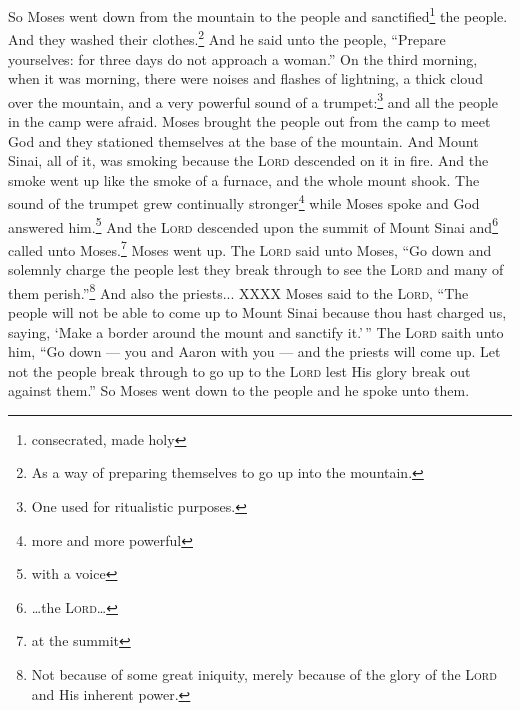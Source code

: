 \begin{enumerate}[align=center]
     So Moses went down from the mountain to the people and sanctified\footnote{consecrated, made holy} the people. And they washed their clothes.\footnote{As a way of preparing themselves to go up into the mountain.}%
     And he said unto the people, ``Prepare yourselves: for three days do not approach a woman.''%
     On the third morning, when it was morning, there were noises and flashes of lightning, a thick cloud over the mountain, and a very powerful sound of a trumpet:\footnote{One used for ritualistic purposes.} and all the people in the camp were afraid.%
     Moses brought the people out from the camp to meet God and they stationed themselves at the base of the mountain.%
     And Mount Sinai, all of it, was smoking because the \textsc{Lord} descended on it in fire. And the smoke went up like the smoke of a furnace, and the whole mount shook.%
     The sound of the trumpet grew continually stronger\footnote{more and more powerful} while Moses spoke and God answered him.\footnote{with a voice}%
     And the \textsc{Lord} descended upon the summit of Mount Sinai and\footnote{\dots the \textsc{Lord}\dots} called unto Moses.\footnote{at the summit} Moses went up.%
     The \textsc{Lord} said unto Moses, ``Go down and solemnly charge the people lest they break through to see the \textsc{Lord} and many of them perish.''\footnote{Not because of some great iniquity, merely because of the glory of the \textsc{Lord} and His inherent power.}%
     And also the priests... XXXX%
     Moses said to the \textsc{Lord}, ``The people will not be able to come up to Mount Sinai because thou hast charged us, saying, `Make a border around the mount and sanctify it.'$\,$''%
     The \textsc{Lord} saith unto him, ``Go down — you and Aaron with you — and the priests will come up. Let not the people break through to go up to the \textsc{Lord} lest His glory break out against them.''%
     So Moses went down to the people and he spoke unto them.%
\end{enumerate}
